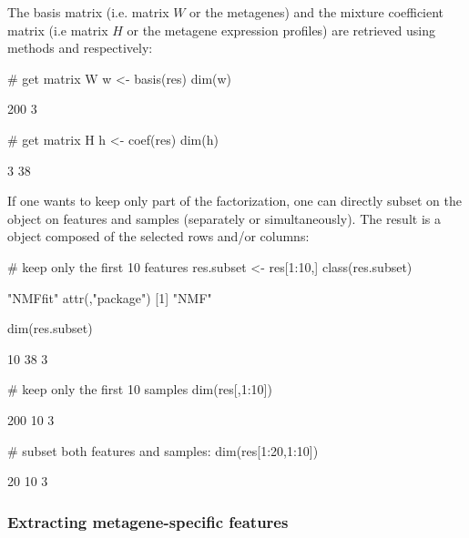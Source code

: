 \documentclass[a4paper]{article}
\begin{document}
The basis matrix (i.e. matrix $W$ or the metagenes) and the mixture coefficient 
matrix (i.e matrix $H$ or the metagene expression profiles) are retrieved using 
methods  and  respectively:

\begin{Schunk}
\begin{Sinput}
 # get matrix W
 w <- basis(res)
 dim(w)
\end{Sinput}
\begin{Soutput}
[1] 200   3
\end{Soutput}
\begin{Sinput}
 # get matrix H
 h <- coef(res)
 dim(h)
\end{Sinput}
\begin{Soutput}
[1]  3 38
\end{Soutput}
\end{Schunk}


If one wants to keep only part of the factorization, one can directly subset 
on the  object on features and samples (separately or simultaneously).
The result is a  object composed of the selected rows and/or columns:
\begin{Schunk}
\begin{Sinput}
 # keep only the first 10 features
 res.subset <- res[1:10,] 
 class(res.subset)
\end{Sinput}
\begin{Soutput}
[1] "NMFfit"
attr(,"package")
[1] "NMF"
\end{Soutput}
\begin{Sinput}
 dim(res.subset)
\end{Sinput}
\begin{Soutput}
[1] 10 38  3
\end{Soutput}
\begin{Sinput}
 # keep only the first 10 samples 
 dim(res[,1:10])
\end{Sinput}
\begin{Soutput}
[1] 200  10   3
\end{Soutput}
\begin{Sinput}
 # subset both features and samples:
 dim(res[1:20,1:10])
\end{Sinput}
\begin{Soutput}
[1] 20 10  3
\end{Soutput}
\end{Schunk}

\subsubsection{Extracting metagene-specific features}
\end{document}
